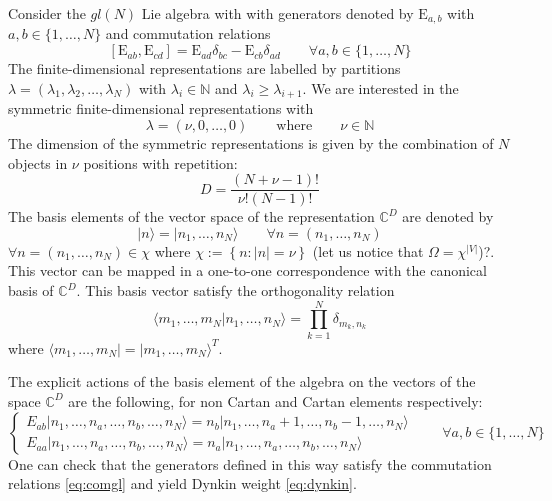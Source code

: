 \documentclass[11pt]{article}
\numberwithin{equation}{section}
\newcommand{\EE}{\mathrm{E}}
\newcommand{\twoj}{\nu}
\begin{document}
Consider the $gl(N)$ Lie algebra with with generators denoted by $\EE_{a,b}$ with $a,b\in \{1,\ldots,N\}$ and commutation relations
\begin{equation}\label{eq:comgl}
\left[\EE_{ab},\EE_{cd}\right]=\EE_{ad}\delta_{bc}-\EE_{cb}\delta_{ad}\qquad \forall a,b\in \{1,\ldots,N\}
\end{equation}
The finite-dimensional representations are labelled by partitions $\lambda=(\lambda_1,\lambda_2,\ldots,\lambda_N)$ with $\lambda_i\in \mathbb{N}$ and  $\lambda_i\geq \lambda_{i+1}$.
We are interested in the symmetric finite-dimensional representations with 
\begin{equation}\label{eq:dynkin}
    \lambda=(\twoj,0,\ldots,0) \qquad\text{where}\qquad \twoj\in\mathbb{N}
\end{equation} 
The dimension of the symmetric representations is given by the combination of $N$ objects in $\twoj$ positions with repetition:
\begin{equation}
	D= \frac{(N+\twoj-1)!}{\twoj  !(N-1)!}
\end{equation} 
The basis elements of the vector space of the representation $\mathbb{C}^{D}$ are denoted by 
\begin{equation}
  |n\rangle=  |n_{1},\ldots,n_{N}\rangle\qquad \forall
    n=(n_{1},\ldots,n_{N})
\end{equation}
$\forall n=(n_{1},\ldots,n_{N})\in \chi$ where $\chi:=\left\{n:|n|=\twoj\right\}$ {\color{red}(let us notice that $\Omega=\chi^{|V|}$)?}. This vector can be mapped in a one-to-one correspondence with the canonical basis of $\mathbb{C}^{D}$. This basis vector satisfy the orthogonality relation
\begin{equation}\label{ortho}
    \langle m_{1},\ldots,m_{N}|n_{1},\ldots,n_{N}\rangle=\prod_{k=1}^{N}\delta_{m_{k},n_{k}}
\end{equation}
where  $ \langle m_{1},\ldots,m_{N}|=| m_{1},\ldots,m_{N}\rangle^T$.
 
The explicit actions of the basis element of the algebra on the vectors of the space $\mathbb{C}^{D}$ are the following, for non Cartan and Cartan elements respectively: 
\begin{equation}\label{actionE}
	\begin{cases}
		E_{ab}|n_{1},\ldots,n_{a},\ldots,n_{b},\ldots,n_{N}\rangle =n_{b}|n_{1},\ldots,n_{a}+1,\ldots,n_{b}-1,\ldots,n_{N}\rangle\\[0.1cm]
		E_{aa}|n_{1},\ldots,n_{a},\ldots,n_{b},\ldots,n_{N}\rangle = n_{a} |n_{1},\ldots,n_{a},\ldots,n_{b},\ldots,n_{N}\rangle
	\end{cases}\qquad \forall a,b\in\{1,\ldots,N\}
\end{equation}  
One can check that the generators defined in this way satisfy the commutation relations \eqref{eq:comgl} and yield Dynkin weight \eqref{eq:dynkin}.
\end{document}
